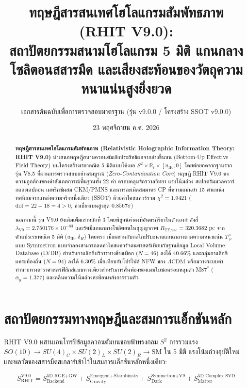 \documentclass[11pt, a4paper]{article}
\title{\textbf{\color{primary}ทฤษฎีสารสนเทศโฮโลแกรมสัมพัทธภาพ (RHIT V9.0):\\สถาปัตยกรรมสนามโฮโลแกรม 5 มิติ แกนกลางโซลิตอนสสารมืด และเสียงสะท้อนของวัตถุความหนาแน่นสูงยิ่งยวด}}
\author{เอกสารต้นฉบับเพื่อการตรวจสอบมาตรฐาน (รุ่น v9.0.0 / โครงสร้าง SSOT v9.0.0)}
\date{23 พฤศจิกายน ค.ศ. 2026}
\begin{document}
\maketitle

\begin{abstract}
\noindent\textbf{ทฤษฎีสารสนเทศโฮโลแกรมสัมพัทธภาพ (Relativistic Holographic Information Theory: RHIT V9.0)} นำเสนอทฤษฎีสนามควอนตัมเชิงประสิทธิผลจากล่างขึ้นบน (Bottom-Up Effective Field Theory) บนโครงสร้างเรขาคณิต 5 มิติแบบโค้งงอ $S^2 \times \mathbb{R}_t \times [u_{\text{IR}}, 0]$ โดยต่อยอดจากฐานรากรุ่น V8.5 ที่ผ่านการตรวจสอบอย่างสมบูรณ์ (\emph{Zero-Contamination Core}) ทฤษฎี RHIT V9.0 คงความถูกต้องของค่าสังเกตการณ์พื้นฐานทั้ง 22 ค่า ครอบคลุมจักรวาลวิทยา แรงโน้มถ่วง สเปกตรัมมวลควาร์กและเลปตอน เมทริกซ์ผสม CKM/PMNS และการละเมิดสมมาตร CP ที่ความแม่นยำ 15 ตำแหน่งทศนิยมจากแหล่งความจริงหนึ่งเดียว (SSOT) ด้วยค่าไคสแควร์รวม $\chi^2 = 1.9421$ ($\text{dof} = 22 - 18 = 4 > 0$, ค่าเบี่ยงเบนสูงสุด $0.8567\sigma$)

\vspace{0.5em}
\noindent นอกจากนี้ รุ่น V9.0 ยังเติมเต็มเสาหลักที่ 3 โดยพิสูจน์ค่าคงที่อันตรกิริยาในตัวเองกำลังสี่ $\lambda_{\text{V9}} = 2.750176 \times 10^{-83}$ และรัศมีแกนกลางโซลิตอนในสุญญากาศ $R_{\text{TF,vac}} = 320.3682\text{ pc}$ จากตัวแปรเรขาคณิต 5 มิติ ($u_{\text{IR}}, \delta_H$) โดยตรง เมื่อผสานกับกลไกปรับขนาดแกนกลางตามความหนาแน่น $T^\mu_{\ \mu}$ แบบ Symmetron แบบจำลองสามารถลดค่าไคสแควร์จลนศาสตร์เทียบกับฐานข้อมูล Local Volume Database (LVDB) สำหรับกาแล็กซีบริวารทางช้างเผือก ($N = 46$) ลงได้ $40.66\%$ และกลุ่มกาแล็กซีแคระท้องถิ่น ($N = 94$) ลงได้ $6.30\%$ เมื่อเทียบกับโปรไฟล์ NFW ของ $\Lambda\text{CDM}$ พร้อมวางระบบคำทำนายทางดาราศาสตร์ฟิสิกส์แบบทางเดียวสำหรับการสั่นพ้องของเมฆโบซอนรอบหลุมดำ M87$^*$ ($\alpha_g = 1.377$) และคลื่นความโน้มถ่วงสะท้อนหลังการรวมตัว
\end{abstract}

\section{สถาปัตยกรรมทางทฤษฎีและสมการแอ็กชันหลัก}

RHIT V9.0 ผสานเอนโทรปีข้อมูลควอนตัมบนขอบฟ้าทรงกลม $S^2$ การรวมแรง $SO(10) \to SU(4)_C \times SU(2)_L \times SU(2)_R \to \text{SM}$ ใน 5 มิติ แรงโน้มถ่วงอุบัติใหม่ และพลวัตของสสารมืดสเกลาร์เข้าไว้ในสมการแอ็กชันหลักหนึ่งเดียว:

\begin{equation}
S_{\text{RHIT}}^{\text{V9.0}} = S_{\text{Backend}}^{\text{5D RGE+GW}} + S_{\text{Gravity}}^{\text{Emergent+Starobinsky}} + S_{\text{Dark}}^{\text{Symmetron+V9}} + S_{\text{Matter}}^{\text{5D Complex SVD}}
\end{equation}
\end{document}
